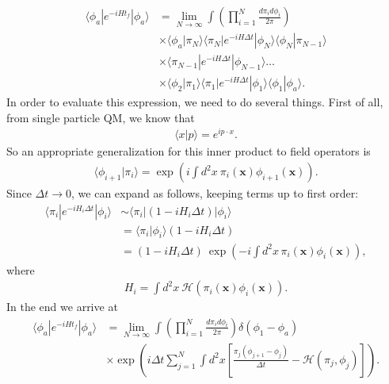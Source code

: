         \begin{align}
            \langle \phi_a| e^{- i H t_f} | \phi_a \rangle &= \lim_{N\rightarrow \infty} \int \left( \prod_{i=1}^{N} \frac{d\pi_i d\phi_i}{2\pi} \right) \nonumber \\
            &\times \langle \phi_a | \pi_N \rangle \langle \pi_N|  e^{-i H \Delta t}| \phi_N \rangle \langle \phi_N | \pi_{N-1} \rangle \nonumber \\
            &\times \langle \pi_{N-1} | e^{-i H \Delta t} | \phi_{N-1} \rangle \dots \nonumber \\
            &\times \langle \phi_2 | \pi_1 \rangle \langle \pi_1 | e^{-i H \Delta t} | \phi_1 \rangle \langle \phi_1 |\phi_a \rangle.
        \end{align}
        In order to evaluate this expression, we need to do several things. First of all, from single particle QM, we know that 
        \begin{align}
            \langle x | p \rangle = e^{i p \cdot x}.
        \end{align}
        So an appropriate generalization for this inner product to field operators is 
        \begin{align}
            \langle \phi_{i+1}| \pi_i \rangle = \exp \left(i \int d^2 x \ \pi_i(\bm{x}) \phi_{i+1}(\bm{x}) \right).
        \end{align}
        Since $\Delta t \rightarrow 0$, we can expand as follows, keeping terms up to first order:
        \begin{align}
            \langle \pi_i | e^{-i H_i \Delta t} | \phi_i \rangle &\sim \langle \pi_i | (1- i H_i \Delta t ) | \phi_i \rangle \nonumber \\
            &= \langle \pi_i | \phi_i \rangle (1 - i H_i \Delta t) \nonumber \\
            & = (1-i H_i \Delta t) \ \exp\left(-i \int d^2x \, \pi_i(\bm{x}) \phi_i (\bm{x})  \right),
        \end{align}
        where
        \begin{align}
            H_i = \int d^2 x \ \mathcal{H}\left(\pi_i (\bm{x}) \phi_i (\bm{x}) \right).
        \end{align}
        In the end we arrive at 
        \begin{align}
            \langle \phi_a | e^{-i H t_f} | \phi_a \rangle &= \lim_{N\rightarrow \infty} \int \left( \prod_{i=1}^N \frac{d \pi_i d\phi_i}{2\pi} \right) \delta \left(\phi_1 -\phi_a \right) \nonumber \\
            &\times \exp \left(i \Delta t \sum_{j=1}^{N} \int d^2x \left[\frac{\pi_j (\phi_{j+1} -\phi_j)}{\Delta t} - \mathcal{H}(\pi_j, \phi_j) \right] \right).
        \end{align}
